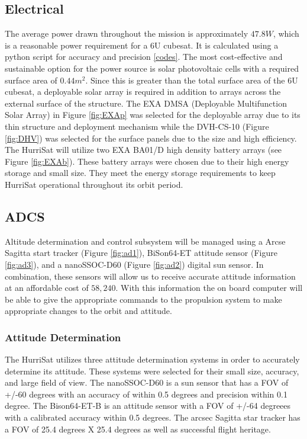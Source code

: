\subsection{Electrical}
The average power drawn throughout the mission is approximately $47.8W$, which is a reasonable power requirement for a 6U cubesat. It is calculated using a python script for accuracy and precision \ref{codes}. The most cost-effective and sustainable option for the power source is solar photovoltaic cells with a required surface area of $0.44m^2$. Since this is greater than the total surface area of the 6U cubesat, a deployable solar array is required in addition to arrays across the external surface of the structure. The EXA DMSA (Deployable Multifunction Solar Array) in Figure \ref{fig:EXAp} was selected for the deployable array due to its thin structure and deployment mechanism while the DVH-CS-10 (Figure \ref{fig:DHV}) was selected for the surface panels due to the size and high efficiency.\newline
The HurriSat will utilize two EXA BA01/D high density battery arrays (see Figure \ref{fig:EXAb}). These battery arrays were chosen due to their high energy storage and small size. They meet the energy storage requirements to keep HurriSat operational throughout its orbit period.
\subsection{ADCS }
Altitude determination and control subsystem will be managed using a Arcse Sagitta start tracker (Figure \ref{fig:ad1}), BiSon64-ET attitude sensor (Figure \ref{fig:ad3}), and a nanoSSOC-D60 (Figure \ref{fig:ad2}) digital sun sensor.  In combination, these sensors will allow us to receive accurate attitude information at an affordable cost of $58,240$. With this information the on board computer will be able to give the appropriate commands to the propulsion system to make appropriate changes to the orbit and attitude.

\subsubsection{Attitude Determination}
The HurriSat utilizes three attitude determination systems in order to accurately determine its attitude. These systems were selected for their small size, accuracy, and large field of view. The nanoSSOC-D60 is a sun sensor that has a FOV of +/-60 degrees with an accuracy of within 0.5 degrees and precision within 0.1 degree. The Bison64-ET-B is an attitude sensor with a FOV of +/-64 degreees with a calibrated accuracy within 0.5 degrees. The arcsec Sagitta star tracker has a FOV of 25.4 degrees X 25.4 degrees as well as successful flight heritage. 

